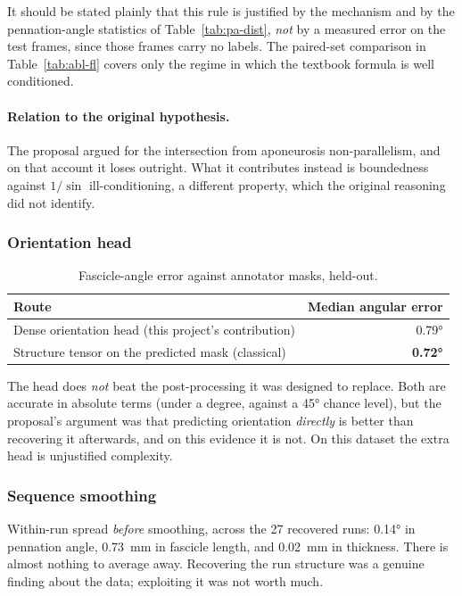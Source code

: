 \documentclass[11pt,a4paper]{article}
\begin{document}
It should be stated plainly that this rule is justified by the mechanism and by
the pennation-angle statistics of Table~\ref{tab:pa-dist}, \emph{not} by a
measured error on the test frames, since those frames carry no labels. The
paired-set comparison in Table~\ref{tab:abl-fl} covers only the regime in which
the textbook formula is well conditioned.

\paragraph{Relation to the original hypothesis.} The proposal argued for the
intersection from aponeurosis non-parallelism, and on that account it loses
outright. What it contributes instead is boundedness against $1/\sin$
ill-conditioning, a different property, which the original reasoning did not
identify.

\subsubsection{Orientation head}
\label{sec:abl-orientation}

\begin{table}[htbp]
\centering
\caption{Fascicle-angle error against annotator masks, held-out.}
\label{tab:abl-ori}
\begin{tabular}{lr}
\toprule
\textbf{Route} & \textbf{Median angular error} \\
\midrule
Dense orientation head (this project's contribution) & \ang{0.79} \\
Structure tensor on the predicted mask (classical) & \textbf{\ang{0.72}} \\
\bottomrule
\end{tabular}
\end{table}

The head does \emph{not} beat the post-processing it was designed to replace.
Both are accurate in absolute terms (under a degree, against a \ang{45} chance
level), but the proposal's argument was that predicting orientation
\emph{directly} is better than recovering it afterwards, and on this evidence it
is not. On this dataset the extra head is unjustified complexity.

\subsubsection{Sequence smoothing}

Within-run spread \emph{before} smoothing, across the 27 recovered runs:
\ang{0.14} in pennation angle, \SI{0.73}{\milli\metre} in fascicle length, and
\SI{0.02}{\milli\metre} in thickness. There is almost nothing to average away.
Recovering the run structure was a genuine finding about the data; exploiting it
was not worth much.
\end{document}
